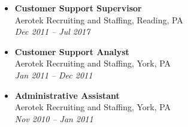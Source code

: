 \documentclass[
  letterpaper,
  DIV=11,
  numbers=noendperiod]{scrartcl}
\begin{document}
\begin{itemize}
\item
  \textbf{Customer Support Supervisor}\\
  Aerotek Recruiting and Staffing, Reading, PA\\
  \emph{Dec 2011 -- Jul 2017}
\item
  \textbf{Customer Support Analyst}\\
  Aerotek Recruiting and Staffing, York, PA\\
  \emph{Jan 2011 -- Dec 2011}
\item
  \textbf{Administrative Assistant}\\
  Aerotek Recruiting and Staffing, York, PA\\
  \emph{Nov 2010 -- Jan 2011}
\end{itemize}
\end{document}
